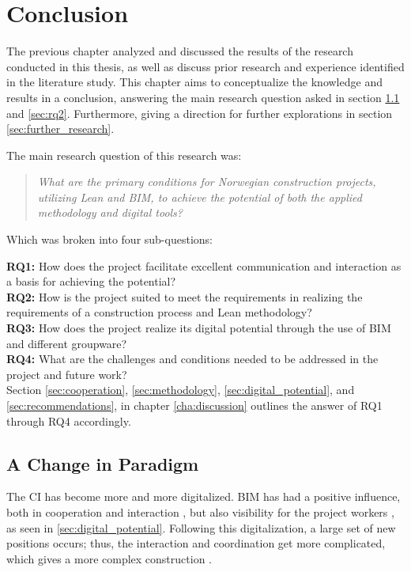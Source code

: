 
\chapter{Conclusion} \label{cha:conclusion}
The previous chapter analyzed and discussed the results of the research conducted in this thesis, as well as discuss prior research and experience identified in the literature study. This chapter aims to conceptualize the knowledge and results in a conclusion, answering the main research question asked in section \ref{sec:rq1} and \ref{sec:rq2}. Furthermore, giving a direction for further explorations in section \ref{sec:further_research}.

\noindent The main research question of this research was: 
\begin{quote}
    \textit{What are the primary conditions for Norwegian construction projects, utilizing Lean and BIM, to achieve the potential of both the applied methodology and digital tools?} 
\end{quote}

\noindent Which was broken into four sub-questions:

{\noindent \bf RQ1:} How does the project facilitate excellent communication and interaction as a basis for achieving the potential? \\
{\bf RQ2:} How is the project suited to meet the requirements in realizing the requirements of a construction process and Lean methodology? \\
{\bf RQ3:} How does the project realize its digital potential through the use of BIM and different groupware? \\
{\bf RQ4:} What are the challenges and conditions needed to be addressed in the project and future work? \\

Section \ref{sec:cooperation}, \ref{sec:methodology}, \ref{sec:digital_potential}, and \ref{sec:recommendations}, in chapter \ref{cha:discussion} outlines the answer of RQ1 through RQ4 accordingly.

\section{A Change in Paradigm} \label{sec:rq1}
The CI has become more and more digitalized. BIM has had a positive influence, both in cooperation and interaction \citep{frank_gehry, gu2010understanding}, but also visibility for the project workers \citep{arayici2010building}, as seen in \ref{sec:digital_potential}. Following this digitalization, a large set of new positions occurs; thus, the interaction and coordination get more complicated, which gives a more complex construction \citep{arayici2010building, eadie2013bim, arayici2011technology}.

